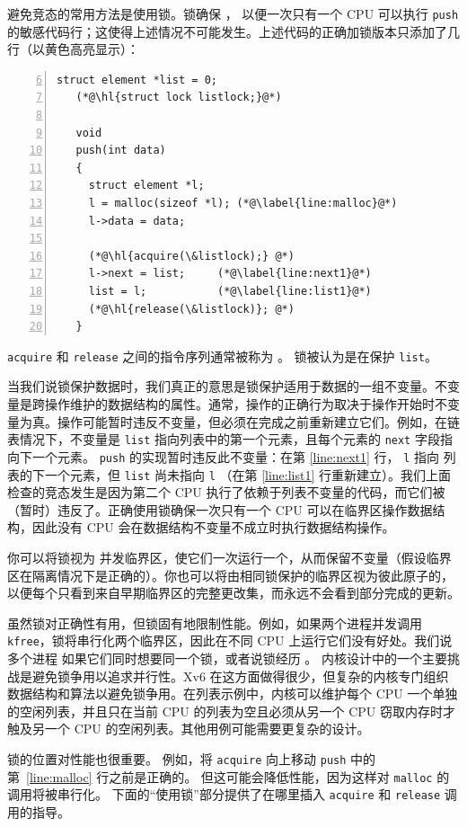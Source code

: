 避免竞态的常用方法是使用锁。锁确保
，
以便一次只有一个 CPU 可以执行
\lstinline{push}
的敏感代码行；这使得上述情况不可能发生。上述代码的正确加锁版本只添加了几行（以黄色高亮显示）：
\begin{lstlisting}[numbers=left,firstnumber=6]
   struct element *list = 0;
   (*@\hl{struct lock listlock;}@*)
    	
   void
   push(int data)
   {
     struct element *l;
     l = malloc(sizeof *l); (*@\label{line:malloc}@*)
     l->data = data;
   
     (*@\hl{acquire(\&listlock);} @*)
     l->next = list;     (*@\label{line:next1}@*)
     list = l;           (*@\label{line:list1}@*)
     (*@\hl{release(\&listlock)}; @*)
   }
\end{lstlisting}
\lstinline{acquire}
和
\lstinline{release}
之间的指令序列通常被称为
。
锁被认为是在保护
\lstinline{list}。

当我们说锁保护数据时，我们真正的意思是锁保护适用于数据的一组不变量。不变量是跨操作维护的数据结构的属性。通常，操作的正确行为取决于操作开始时不变量为真。操作可能暂时违反不变量，但必须在完成之前重新建立它们。例如，在链表情况下，不变量是
\lstinline{list}
指向列表中的第一个元素，且每个元素的
\lstinline{next}
字段指向下一个元素。
\lstinline{push}
的实现暂时违反此不变量：在第 \ref{line:next1} 行，
\lstinline{l}
指向
列表的下一个元素，但
\lstinline{list}
尚未指向
\lstinline{l}
（在第 \ref{line:list1} 行重新建立）。我们上面检查的竞态发生是因为第二个 CPU 执行了依赖于列表不变量的代码，而它们被（暂时）违反了。正确使用锁确保一次只有一个 CPU 可以在临界区操作数据结构，因此没有 CPU 会在数据结构不变量不成立时执行数据结构操作。

你可以将锁视为
并发临界区，使它们一次运行一个，从而保留不变量（假设临界区在隔离情况下是正确的）。你也可以将由相同锁保护的临界区视为彼此原子的，以便每个只看到来自早期临界区的完整更改集，而永远不会看到部分完成的更新。

虽然锁对正确性有用，但锁固有地限制性能。例如，如果两个进程并发调用 {\tt kfree}，锁将串行化两个临界区，因此在不同 CPU 上运行它们没有好处。我们说多个进程
如果它们同时想要同一个锁，或者说锁经历
。
内核设计中的一个主要挑战是避免锁争用以追求并行性。Xv6 在这方面做得很少，但复杂的内核专门组织数据结构和算法以避免锁争用。在列表示例中，内核可以维护每个 CPU 一个单独的空闲列表，并且只在当前 CPU 的列表为空且必须从另一个 CPU 窃取内存时才触及另一个 CPU 的空闲列表。其他用例可能需要更复杂的设计。

锁的位置对性能也很重要。
例如，将
\lstinline{acquire}
向上移动
\lstinline{push}
中的
第~\ref{line:malloc} 行之前是正确的。
但这可能会降低性能，因为这样对
\lstinline{malloc}
的调用将被串行化。
下面的``使用锁''部分提供了在哪里插入
\lstinline{acquire}
和
\lstinline{release}
调用的指导。
